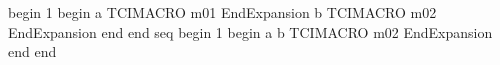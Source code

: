 begin
1
begin
a
TCIMACRO
m01
EndExpansion
b
TCIMACRO
m02
EndExpansion
end
end
seq
begin
1
begin
a
b
TCIMACRO
m02
EndExpansion
end
end
